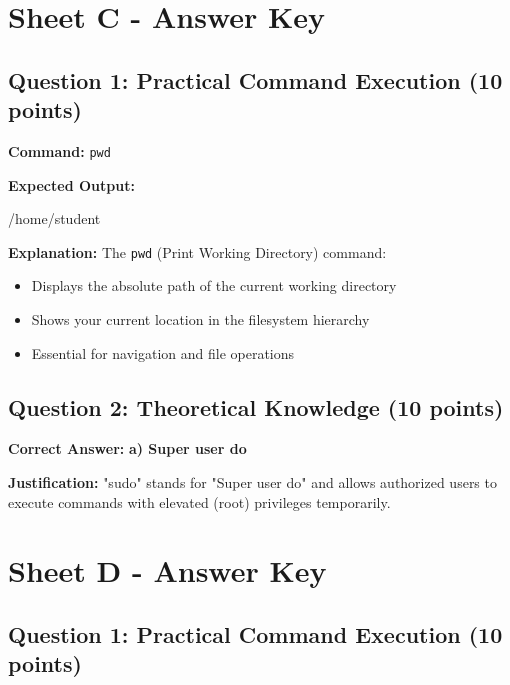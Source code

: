 \documentclass[a4paper,11pt]{article}
\begin{document}
\section*{Sheet C - Answer Key}

\subsection*{Question 1: Practical Command Execution (10 points)}

\textbf{Command:} \texttt{pwd}

\textbf{Expected Output:}
\begin{tcolorbox}[colback=lightgray,colframe=primaryblue,boxrule=0.5pt]
\ttfamily\small
/home/student
\end{tcolorbox}

\textbf{Explanation:} The \texttt{pwd} (Print Working Directory) command:
\begin{itemize}[leftmargin=*,itemsep=2pt]
    \item Displays the absolute path of the current working directory
    \item Shows your current location in the filesystem hierarchy
    \item Essential for navigation and file operations
\end{itemize}

\subsection*{Question 2: Theoretical Knowledge (10 points)}

\textbf{Correct Answer:} \textcolor{successgreen}{\textbf{a) Super user do}}

\textbf{Justification:} "sudo" stands for "Super user do" and allows authorized users to execute commands with elevated (root) privileges temporarily.

\newpage

\section*{Sheet D - Answer Key}

\subsection*{Question 1: Practical Command Execution (10 points)}
\end{document}
